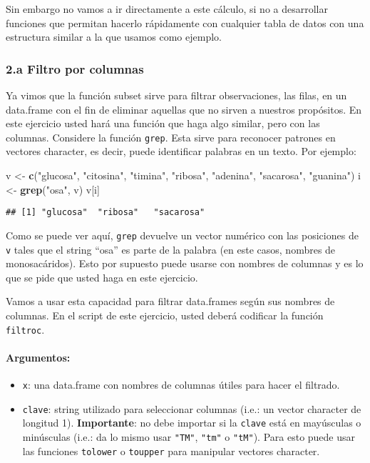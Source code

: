 \documentclass[]{article}
\newenvironment{Shaded}{}{}
\newcommand{\KeywordTok}[1]{\textcolor[rgb]{0.00,0.44,0.13}{\textbf{{#1}}}}
\newcommand{\StringTok}[1]{\textcolor[rgb]{0.25,0.44,0.63}{{#1}}}
\newcommand{\NormalTok}[1]{{#1}}
\begin{document}
Sin embargo no vamos a ir directamente a este cálculo, si no a
desarrollar funciones que permitan hacerlo rápidamente con cualquier
tabla de datos con una estructura similar a la que usamos como ejemplo.

\subsubsection{2.a Filtro por columnas}

Ya vimos que la función subset sirve para filtrar observaciones, las
filas, en un data.frame con el fin de eliminar aquellas que no sirven a
nuestros propósitos. En este ejercicio usted hará una función que haga
algo similar, pero con las columnas. Considere la función \texttt{grep}.
Esta sirve para reconocer patrones en vectores character, es decir,
puede identificar palabras en un texto. Por ejemplo:

\begin{Shaded}
\begin{Highlighting}[]
\NormalTok{v <- }\KeywordTok{c}\NormalTok{(}\StringTok{"glucosa"}\NormalTok{, }\StringTok{"citosina"}\NormalTok{, }\StringTok{"timina"}\NormalTok{, }\StringTok{"ribosa"}\NormalTok{, }\StringTok{"adenina"}\NormalTok{, }\StringTok{"sacarosa"}\NormalTok{, }\StringTok{"guanina"}\NormalTok{)}
\NormalTok{i <- }\KeywordTok{grep}\NormalTok{(}\StringTok{"osa"}\NormalTok{, v)}
\NormalTok{v[i]}
\end{Highlighting}
\end{Shaded}
\begin{verbatim}
## [1] "glucosa"  "ribosa"   "sacarosa"
\end{verbatim}
Como se puede ver aquí, \texttt{grep} devuelve un vector numérico con
las posiciones de \texttt{v} tales que el string ``osa'' es parte de la
palabra (en este casos, nombres de monosacáridos). Esto por supuesto
puede usarse con nombres de columnas y es lo que se pide que usted haga
en este ejercicio.

Vamos a usar esta capacidad para filtrar data.frames según sus nombres
de columnas. En el script de este ejercicio, usted deberá codificar la
función \texttt{filtroc}.

\paragraph{Argumentos:}

\begin{itemize}
\item
  \texttt{x}: una data.frame con nombres de columnas útiles para hacer
  el filtrado.
\item
  \texttt{clave}: string utilizado para seleccionar columnas (i.e.: un
  vector character de longitud 1). \textbf{Importante}: no debe importar
  si la \texttt{clave} está en mayúsculas o minúsculas (i.e.: da lo
  mismo usar \texttt{"TM"}, \texttt{"tm"} o \texttt{"tM"}). Para esto
  puede usar las funciones \texttt{tolower} o \texttt{toupper} para
  manipular vectores character.
\end{itemize}
\end{document}
